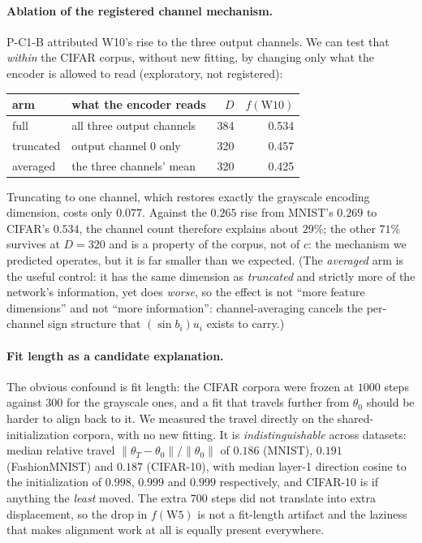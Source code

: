 \paragraph{Ablation of the registered channel mechanism.} P-C1-B attributed W10's rise to
the three output channels. We can test that \emph{within} the CIFAR corpus, without new fitting,
by changing only what the encoder is allowed to read (exploratory, not registered):

\begin{center}\small
\begin{tabular}{@{}llrr@{}}
\toprule
arm & what the encoder reads & $D$ & $f(\mathrm{W10})$ \\
\midrule
full        & all three output channels                & 384 & 0.534 \\
truncated   & output channel 0 only                    & 320 & 0.457 \\
averaged    & the three channels' mean                 & 320 & 0.425 \\
\bottomrule
\end{tabular}
\end{center}

Truncating to one channel, which restores exactly the grayscale encoding dimension, costs only $0.077$. Against the $0.265$ rise from MNIST's $0.269$ to CIFAR's $0.534$, the channel count
therefore explains about $29\%$; the other $71\%$ survives at $D = 320$ and is a property of the
corpus, not of $c$: the mechanism we predicted operates, but it is far smaller than we expected. (The \emph{averaged} arm is
the useful control: it has the same dimension as \emph{truncated} and strictly more of the
network's information, yet does \emph{worse}, so the effect is not ``more feature dimensions'' and
not ``more information'': channel-averaging cancels the per-channel sign structure that
$(\sin b_i)u_i$ exists to carry.)

\paragraph{Fit length as a candidate explanation.} The obvious confound is fit length: the
CIFAR corpora were frozen at $1000$ steps against $300$ for the grayscale ones, and a fit that
travels further from $\theta_0$ should be harder to align back to it. We measured the travel
directly on the shared-initialization corpora, with no new fitting. It is
\emph{indistinguishable} across datasets: median relative travel
$\|\theta_T - \theta_0\| / \|\theta_0\|$ of $0.186$ (MNIST), $0.191$ (FashionMNIST) and $0.187$
(CIFAR-10), with median layer-1 direction cosine to the initialization of $0.998$, $0.999$ and
$0.999$ respectively, and CIFAR-10 is if anything the \emph{least} moved. The extra $700$ steps did
not translate into extra displacement, so the drop in $f(\mathrm{W5})$ is not a fit-length
artifact and the laziness that makes alignment work at all is equally present everywhere.

